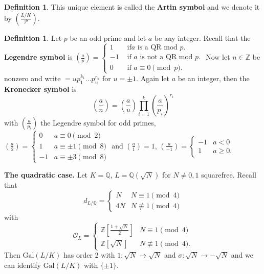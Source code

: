 \documentclass{article}
\theoremstyle{definition}
\newtheorem{defn}[theorem]{Definition}
\begin{document}
\begin{defn}
    This unique element is called the \textbf{Artin symbol} and we denote it by $\left(\frac{L/K}{\mathcal{P}}\right)$.
\end{defn}
\begin{defn}
    Let $p$ be an odd prime and let $a$ be any integer. Recall that the \textbf{Legendre symbol} is $\left( \frac{a}{p}\right) = \begin{cases}
        1 &\text{ if} a \text{ is a QR mod }p.\\
        -1&\text{ if } a \text{ is not a QR mod }p.\\
        0 &\text{ if }a \equiv 0\pmod{p}.
    \end{cases}$
    Now let $n \in \mathbb{Z}$ be nonzero and write $ = u p_1^{k_1}\ldots p_u^{r_u}$ for $u = \pm 1$. Again let $a$ be an integer, then the \textbf{Kronecker symbol} is \[
    \left(\frac{a}{n}\right) = \left(\frac{a}{u}\right) \prod_{i=1}^{k} \left(\frac{a}{p_i}\right)^{r_i}
    \]
    with $\left(\frac{a}{p_i}\right)$ the Legendre symbol for odd primes, $\left(\frac{a}{2}\right) = \begin{cases}
        0 &a \equiv 0\pmod{2}\\
        1&a \equiv \pm 1 \pmod{8}\\
        -1 &a \equiv \pm 3 \pmod{8}
    \end{cases}$
    and $\left(\frac{a}{1}\right) =1$, $\left(\frac{a}{-1}\right) = \begin{cases}
        -1 & a<0\\
        1 &a\ge 0.
    \end{cases}$
\end{defn}
\textbf{The quadratic case.} Let $K=\mathbb{Q}$, $L = \mathbb{Q}(\sqrt{N})$ for $N\neq 0,1$ squarefree. Recall that \[
d_{L/\mathbb{Q}} = \begin{cases}
    N & N \equiv 1 \pmod{4}\\
    4N& N \not\equiv 1 \pmod{4}
\end{cases}
\]
with \[
\mathcal{O}_L = \begin{cases}
    \mathbb{Z}\left[\frac{1+\sqrt{N}}{2}\right] & N \equiv 1 \pmod{4}\\
    \mathbb{Z}[\sqrt{N}] & N \not\equiv 1\pmod{4}.
\end{cases}
\]
Then $\text{Gal}(L/K)$ has order 2 with $1 : \sqrt{N} \to \sqrt{N}$ and $\sigma: \sqrt{N} \to -\sqrt{N}$ and we can identify $\text{Gal}(L/K)$ with $\{\pm 1\}$. 
\vspace{1mm}
 
\end{document}
